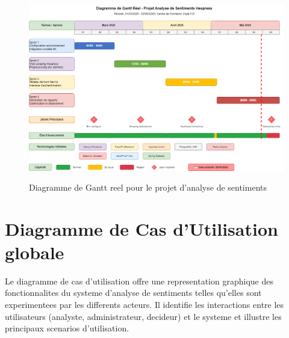 \begin{figure}[H]
\centering
\includegraphics[height=8cm , width=\textwidth]{assets/images/gantt-reel.png}
\caption{Diagramme de Gantt reel pour le projet d'analyse de sentiments}
\label{fig:gantt-reel}
\end{figure}

\section{Diagramme de Cas d'Utilisation globale}

Le diagramme de cas d'utilisation offre une representation graphique des fonctionnalites du systeme d'analyse de sentiments telles qu'elles sont experimentees par les differents acteurs. Il identifie les interactions entre les utilisateurs (analyste, administrateur, decideur) et le systeme et illustre les principaux scenarios d'utilisation.

